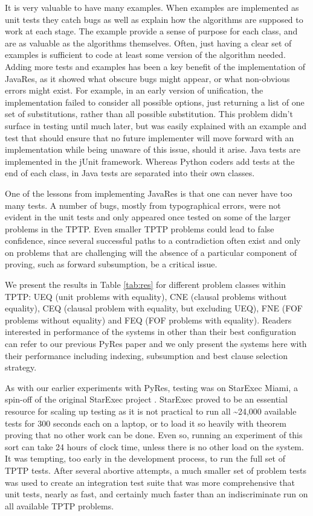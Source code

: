 \documentclass{llncs}
\begin{document}
It is very valuable to have many examples.  When examples are
implemented as unit tests they catch bugs as well as explain how the
algorithms are supposed to work at each stage.  The example provide a
sense of purpose for each class, and are as valuable as the algorithms
themselves.  Often, just having a clear set of examples is sufficient
to code at least some version of the algorithm needed.  Adding more
tests and examples has been a key benefit of the implementation of
JavaRes, as it showed what obscure bugs might appear, or what
non-obvious errors might exist.  For example, in an early version of
unification, the implementation failed to consider all possible
options, just returning a list of one set of substitutions, rather
than all possible substitution.  This problem didn't surface in
testing until much later, but was easily explained with an example and
test that should ensure that no future implementer will move forward
with an implementation while being unaware of this issue, should it
arise.  Java tests are implemented in the jUnit framework.  Whereas
Python coders add tests at the end of each class, in Java tests are
separated into their own classes.

One of the lessons from implementing JavaRes is that one can never
have too many tests.  A number of bugs, mostly from typographical
errors, were not evident in the unit tests and only appeared once
tested on some of the larger problems in the TPTP.  Even smaller TPTP
problems could lead to false confidence, since several successful
paths to a contradiction often exist and only on problems that are
challenging will the absence of a particular component of proving,
such as forward subsumption, be a critical issue.



We present the results in Table \ref{tab:res} for different problem
classes within TPTP: UEQ (unit problems with equality), CNE (clausal
problems without equality), CEQ (clausal problem with equality, but
excluding UEQ), FNE (FOF problems without equality) and FEQ (FOF
problems with equality).  Readers interested in performance of the
systems in other than their best configuration can refer to our
previous PyRes paper and we only present the systems here with their
performance including indexing, subsumption and best clause selection
strategy.

As with our earlier experiments with PyRes, testing was on StarExec
Miami, a spin-off of the original StarExec project
\cite{SST:IJCAR-2014}. StarExec proved to be an essential resource for
scaling up testing as it is not practical to run all
\textasciitilde24,000 available tests for 300 seconds each on a
laptop, or to load it so heavily with theorem proving that no other
work can be done.  Even so, running an experiment of this sort can
take 24 hours of clock time, unless there is no other load on the
system. It was tempting, too early in the development process, to run
the full set of TPTP tests.  After several abortive attempts, a much
smaller set of problem tests was used to create an integration test
suite that was more comprehensive that unit tests, nearly as fast, and
certainly much faster than an indiscriminate run on all available TPTP
problems.
\end{document}
